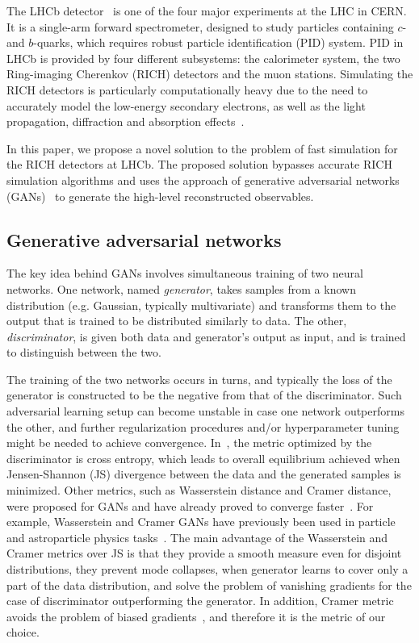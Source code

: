 \documentclass[a4paper]{jpconf}
\begin{document}
The LHCb detector~\cite{Alves:2008zz} is one of the four major experiments at the LHC in CERN. It is a single-arm forward spectrometer, designed to study particles containing $c$- and $b$-quarks, which requires robust particle identification (PID) system. PID in LHCb is provided by four different subsystems: the calorimeter system, the two Ring-imaging Cherenkov (RICH) detectors and the muon stations. Simulating the RICH detectors is particularly computationally heavy due to the need to accurately model the low-energy secondary electrons, as well as the light propagation, diffraction and absorption effects~\cite{Easo:2005xv}.

In this paper, we propose a novel solution to the problem of fast simulation for the RICH detectors at LHCb. The proposed solution bypasses accurate RICH simulation algorithms and uses the approach of generative adversarial networks (GANs)~\cite{Goodfellow:2014upx} to generate the high-level reconstructed observables.


\subsection{Generative adversarial networks}

The key idea behind GANs involves simultaneous training of two neural networks. One network, named \emph{generator}, takes samples from a known distribution (e.g. Gaussian, typically multivariate) and transforms them to the output that is trained to be distributed similarly to data. The other, \emph{discriminator}, is given both data and generator's output as input, and is trained to distinguish between the two.

The training of the two networks occurs in turns, and typically the loss of the generator is constructed to be the negative from that of the discriminator. Such adversarial learning setup can become unstable in case one network outperforms the other, and further regularization procedures and/or hyperparameter tuning might be needed to achieve convergence. In~\cite{Goodfellow:2014upx}, the metric optimized by the discriminator is cross entropy, which leads to overall equilibrium achieved when Jensen-Shannon (JS) divergence between the data and the generated samples is minimized. Other metrics, such as Wasserstein distance and Cramer distance, were proposed for GANs and have already proved to converge faster~\cite{WGAN, DBLP:journals/corr/GulrajaniAADC17, DBLP:journals/corr/BellemareDDMLHM17}. For example, Wasserstein and Cramer GANs have previously been used in particle and astroparticle
physics tasks~\cite{Derkach:2019qfk, Erdmann2018, Erdmann2019}. The main advantage of the Wasserstein and Cramer metrics over JS is that they provide a smooth measure even for disjoint distributions, they prevent mode collapses, when generator learns to cover only a part of the data distribution, and solve the problem of vanishing gradients for the case of discriminator outperforming the generator. In addition, Cramer metric avoids the problem of biased gradients~\cite{DBLP:journals/corr/BellemareDDMLHM17}, and therefore it is the metric of our choice.
\end{document}
